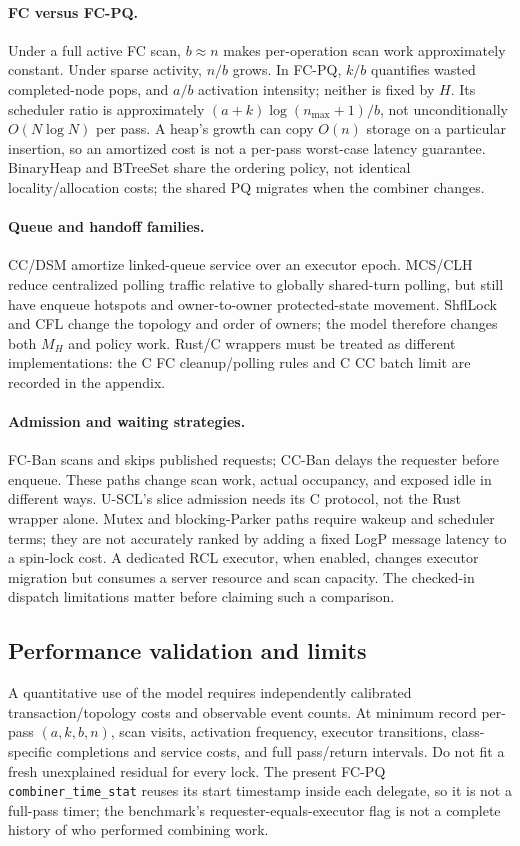\paragraph{FC versus FC-PQ.}
Under a full active FC scan, $b\approx n$ makes per-operation scan work
approximately constant. Under sparse activity, $n/b$ grows. In FC-PQ,
$k/b$ quantifies wasted completed-node pops, and $a/b$ activation intensity;
neither is fixed by $H$. Its scheduler ratio is approximately
$(a+k)\log(n_{\max}+1)/b$, not unconditionally $O(N\log N)$ per pass.
A heap's growth can copy $O(n)$ storage on a particular insertion, so an
amortized cost is not a per-pass worst-case latency guarantee. BinaryHeap
and BTreeSet share the ordering policy, not identical locality/allocation
costs; the shared PQ migrates when the combiner changes.

\paragraph{Queue and handoff families.}
CC/DSM amortize linked-queue service over an executor epoch. MCS/CLH
reduce centralized polling traffic relative to globally shared-turn polling,
but still have enqueue hotspots and owner-to-owner protected-state movement.
ShflLock and CFL change the topology and order of owners; the model therefore
changes both $M_H$ and policy work. Rust/C wrappers must be treated as
different implementations:
the C FC cleanup/polling rules and C CC batch limit are recorded in the appendix.


\paragraph{Admission and waiting strategies.}
FC-Ban scans and skips published requests; CC-Ban delays the requester before
enqueue. These paths change scan work, actual occupancy, and exposed idle
in different ways. U-SCL's slice admission needs its C protocol, not the
Rust wrapper alone. Mutex and blocking-Parker paths require wakeup and
scheduler terms; they are not accurately ranked by adding a fixed LogP
message latency to a spin-lock cost. A dedicated RCL executor, when enabled,
changes executor migration but consumes a server resource and scan capacity.
The checked-in dispatch limitations matter before claiming such a comparison.

\subsection{Performance validation and limits}
\label{sec:performance-validation}
A quantitative use of the model requires independently calibrated
transaction/topology costs and observable event counts. At minimum record
per-pass $(a,k,b,n)$, scan visits, activation frequency, executor transitions,
class-specific completions and service costs, and full pass/return intervals.
Do not fit a fresh unexplained residual for every lock. The present FC-PQ
\texttt{combiner\_time\_stat} reuses its start timestamp inside each delegate,
so it is not a full-pass timer; the benchmark's requester-equals-executor
flag is not a complete history of who performed combining work.


